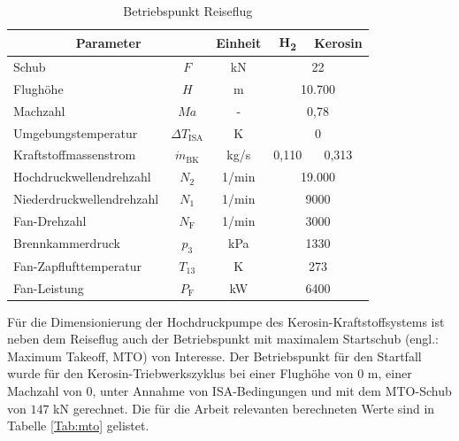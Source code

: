 \begin{table}[ht]
    \centering
	\caption{Betriebspunkt Reiseflug}
	\begin{tabular} {|l|c|c|c|c|} \hline%
    \multicolumn{2}{|c|}{Parameter} & Einheit & H\textsubscript{2} & Kerosin \\ \hline\hline%
    Schub & $F$ & kN & \multicolumn{2}{c|}{22} \\ \hline
    Flughöhe & $H$ & m & \multicolumn{2}{c|}{10.700} \\ \hline
    Machzahl & $Ma$ & - & \multicolumn{2}{c|}{0,78} \\ \hline
    Umgebungstemperatur & $\Delta T_{\mathrm{ISA}}$ & K & \multicolumn{2}{c|}{0} \\ \hline\hline
    Kraftstoffmassenstrom & $\dot{m}_\mathrm{BK}$& kg/s & 0,110 & 0,313 \\ \hline
    Hochdruckwellendrehzahl & $N_2$ & 1/min & \multicolumn{2}{c|}{19.000} \\ \hline
    Niederdruckwellendrehzahl & $N_1$ & 1/min & \multicolumn{2}{c|}{9000} \\ \hline
    Fan-Drehzahl & $N_\mathrm{F}$ & 1/min & \multicolumn{2}{c|}{3000} \\ \hline
    Brennkammerdruck & $p_3$ & kPa & \multicolumn{2}{c|}{1330} \\ \hline
    Fan-Zapflufttemperatur & $T_{13}$ & K & \multicolumn{2}{c|}{273} \\ \hline
    Fan-Leistung & $P_\mathrm{F}$ & kW & \multicolumn{2}{c|}{6400} \\ \hline
    \end{tabular}	
    \label{Tab:cruise}%
\end{table}
\FloatBarrier 

Für die Dimensionierung der Hochdruckpumpe des Kerosin-Kraftstoffsystems ist neben dem Reiseflug auch der Betriebspunkt mit maximalem Startschub (engl.: Maximum Takeoff, MTO) von Interesse. Der Betriebspunkt für den Startfall wurde für den Kerosin-Triebwerkszyklus bei einer Flughöhe von $0$ m, einer Machzahl von $0$, unter Annahme von ISA-Bedingungen und mit dem MTO-Schub von $147$ kN gerechnet. Die für die Arbeit relevanten berechneten Werte sind in Tabelle \ref{Tab:mto} gelistet.

